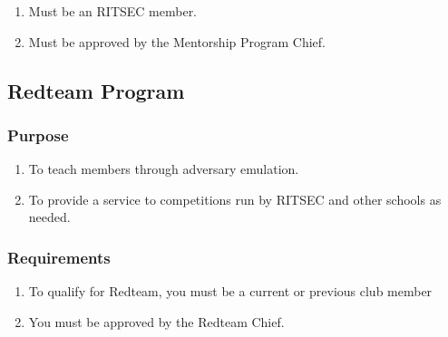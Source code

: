 \begin{enumerate}
  \item Must be an RITSEC member.
  \item Must be approved by the Mentorship Program Chief.
\end{enumerate}

\subsection{Redteam Program}

\subsubsection{Purpose}

\begin{enumerate}
  \item To teach members through adversary emulation.
  \item To provide a service to competitions run by RITSEC and other schools as
    needed.
\end{enumerate}

\subsubsection{Requirements}

\begin{enumerate}
  \item To qualify for Redteam, you must be a current or previous club member
  \item You must be approved by the Redteam Chief.
\end{enumerate}